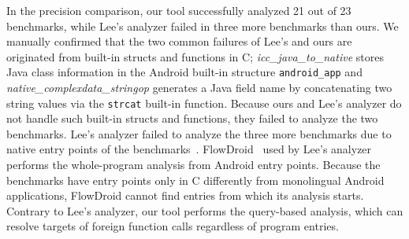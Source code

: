 
In the precision comparison, our tool successfully analyzed 21 out of 23
benchmarks, while Lee's analyzer failed in three more benchmarks than ours. We
manually confirmed that the two common failures of Lee's and ours are
originated from built-in structs and functions in C; {\it
icc\_java\_to\_native} stores Java class information in the Android built-in
structure {\tt android\_app} and {\it native\_complexdata\_stringop} generates
a Java field name by concatenating two string values via the {\tt strcat}
built-in function. Because ours and Lee's analyzer do not handle such built-in
structs and functions, they failed to analyze the two benchmarks.  Lee's
analyzer failed to analyze the three more benchmarks due to native entry points
of the benchmarks~\cite{nativeactivity}. FlowDroid~\cite{Flowdroid} used by
Lee's analyzer performs the whole-program analysis from Android entry points.
Because the benchmarks have entry points only in C differently from monolingual
Android applications, FlowDroid cannot find entries from which its analysis
starts.  Contrary to Lee's analyzer, our tool performs the query-based
analysis, which can resolve targets of foreign function calls regardless of
program entries.



